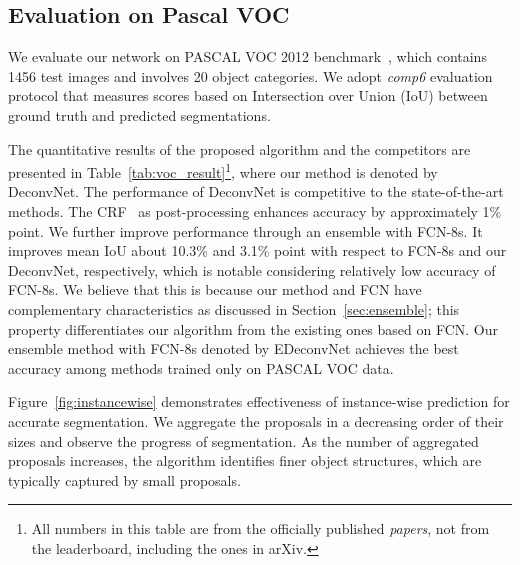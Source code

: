 \documentclass[10pt,twocolumn,letterpaper]{article}
\begin{document}
\subsection{Evaluation on Pascal VOC}
We evaluate our network on PASCAL VOC 2012 benchmark~\cite{Pascalvoc},  which contains 1456 test images and involves 20 object categories.
We adopt {\em comp6} evaluation protocol that measures scores based on Intersection over Union (IoU) between ground truth and predicted segmentations. 

The quantitative results of the proposed algorithm and the competitors are presented in Table~\ref{tab:voc_result}\footnote{All numbers in this table are from the officially published {\em papers}, not from the leaderboard, including the ones in arXiv.}, where our method is denoted by DeconvNet.
The performance of DeconvNet is competitive to the state-of-the-art methods. 
The CRF~\cite{Fullycrf} as post-processing enhances accuracy by approximately 1\% point.
We further improve performance through an ensemble with FCN-8s.
It improves mean IoU about 10.3\% and 3.1\% point with respect to FCN-8s and our DeconvNet, respectively, which is notable considering relatively low accuracy of FCN-8s.
We believe that this is because our method and FCN have complementary characteristics as discussed in Section~\ref{sec:ensemble}; this property differentiates our algorithm from the existing ones based on FCN.
Our ensemble method with FCN-8s denoted by EDeconvNet achieves the best accuracy among methods trained only on PASCAL VOC data. 

Figure~\ref{fig:instancewise} demonstrates effectiveness of instance-wise prediction for accurate segmentation. 
We aggregate the proposals in a decreasing order of their sizes and observe the progress of segmentation.
As the number of aggregated proposals increases, the algorithm identifies finer object structures, which are typically captured by small proposals.

\iffalse
[Discussion of instance-wise prediction]
aggregating outputs of proposals covering different objects constructs accurate segmentation masks for each object.
It suppresses noisy predictions from misaligned proposals.
--various proposals cover objects in various scale, configuration, view?
aggregating outputs of these proposals enhance segmentations while suppressing noisy predictions in background or misaligned locations.
enhance segmentation -> 
\fi

\iffalse
[Discussion of quantitative results---
1) our method itself is already much better than FCN. It is because our method capture fine details of object segmentation.
2) self comparisons? with and without CRF. 
3) discussion on ensemble method---significant performance improvement, which support the argument of the previous sections.
]
\fi
\end{document}
